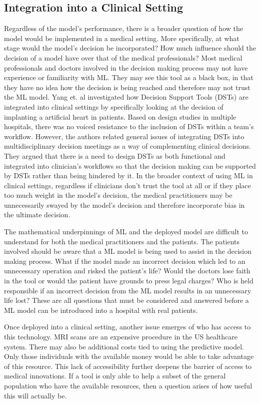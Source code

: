 \documentclass[10pt,twocolumn]{article}
\begin{document}
\subsection{Integration into a Clinical Setting}
Regardless of the model’s performance, there is a broader question of how the model would be implemented in a medical setting. More specifically, at what stage would the model’s decision be incorporated? How much influence should the decision of a model have over that of the medical professionals? Most medical professionals and doctors involved in the decision making process may not have experience or familiarity with ML. They may see this tool as a black box, in that they have no idea how the decision is being reached and therefore may not trust the ML model. Yang et. al \cite{yang2019unremarkable} investigated how Decision Support Tools (DSTs) are integrated into clinical settings by specifically looking at the decision of implanting a artificial heart in patients. Based on design studies in multiple hospitals, there was no voiced resistance to the inclusion of DSTs within a team's workflow. However, the authors related general issues of integrating DSTs into multidisciplinary decision meetings as a way of complementing clinical decisions. They argued that there is a need to design DSTs as both functional and integrated into clinician's workflows so that the decision making can be supported by DSTs rather than being hindered by it. In the broader context of using ML in clinical settings, regardless if clinicians don’t trust the tool at all or if they place too much weight in the model’s decision, the medical practitioners may be unnecessarily swayed by the model’s decision and therefore incorporate bias in the ultimate decision. 

The mathematical underpinnings of ML and the deployed model are difficult to understand for both the medical practitioners and the patients. The patients involved should be aware that a ML model is being used to assist in the decision making process. What if the model made an incorrect decision which led to an unnecessary operation and risked the patient’s life? Would the doctors lose faith in the tool or would the patient have grounds to press legal charges? Who is held responsible if an incorrect decision from the ML model results in an unnecessary life lost? These are all questions that must be considered and answered before a ML model can be introduced into a hospital with real patients.  

Once deployed into a clinical setting, another issue emerges of who has access to this technology. MRI scans are an expensive procedure in the US healthcare system. There may also be additional costs tied to using the predictive model.  Only those individuals with the available money would be able to take advantage of this resource. This lack of accessibility further deepens the barrier of access to medical innovations. If a tool is only able to help a subset of the general population who have the available resources, then a question arises of how useful this will actually be.  
\end{document}
